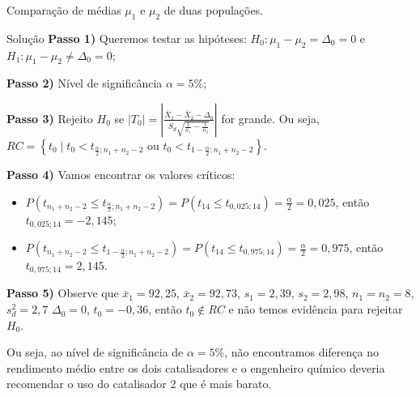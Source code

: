 \documentclass[9pt]{beamer}
\begin{document}
\begin{frame}{Comparação de médias $\mu_1$ e $\mu_2$ de duas populações.}

\small
\begin{block}{Solução}
	\textbf{Passo 1)} Queremos testar as hipóteses:  $H_0: \mu_1 - \mu_2 = \Delta_0 =0$ e $H_1: \mu_1 - \mu_2 \neq \Delta_0 = 0$;
	
	\textbf{Passo 2)} Nível de significância $\alpha=5\%$;
	
	\textbf{Passo 3)} Rejeito $H_0$ se $\lvert T_0 \rvert = \left\lvert \frac{\bar{X}_1 - \bar{X}_2 - \Delta_0}{S_d \sqrt{\frac{1}{n_1} - \frac{1}{n_2}}} \right\rvert$ for grande. Ou seja, $RC = \left\{ t_0 \mid t_0 < t_{\frac{\alpha}{2}; n_1+n_2-2} \mbox{ ou } t_0 < t_{1-\frac{\alpha}{2}; n_1+n_2-2} \right\}$.
	
	\textbf{Passo 4)} Vamos encontrar os valores críticos:
	\begin{itemize}
		\item $P(t_{n_1+n_2-2} \leq t_{\frac{\alpha}{2}; n_1+n_2-2}) = P(t_{14} \leq t_{0,025; 14}) = \frac{\alpha}{2} = 0,025$, então $t_{0,025; 14} = -2,145$;
		\item $P(t_{n_1+n_2-2} \leq t_{1-\frac{\alpha}{2}; n_1+n_2-2}) = P(t_{14} \leq t_{0,975; 14}) = \frac{\alpha}{2} = 0,975$, então $t_{0,975; 14} = 2,145$.
	\end{itemize}

	\textbf{Passo 5)} Observe que $\bar{x}_1=92,25$, $\bar{x}_2 = 92,73$, $s_1=2,39$, $s_2=2,98$, $n_1=n_2=8$, $s_d^2=2,7$ $\Delta_0=0$, $t_0=-0,36$, então $t_0 \not\in RC$ e não temos evidência para rejeitar $H_0$.
	
	Ou seja, ao nível de significância de $\alpha=5\%$, não encontramos diferença no rendimento médio entre os dois catalisadores e o engenheiro químico deveria recomendar o uso do catalisador 2 que é mais barato.
\end{block}
\normalsize
\end{frame}
\end{document}
